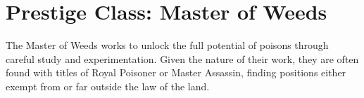 
\usepackage{color} %
\usepackage{fancyhdr} %
\newif\ifdm

\newcommand{\wherein}[1]{\textbf{ \LARGE Wherein} \begin{itemize} #1 \end{itemize}} 
\newcommand{\witem}[1]{\item[$\cdot$] {\em #1} }
\newcommand{\dmonly}[1]{\ifdm { \color{red} #1 } \else { } \fi}
\newcommand{\HS}{H\'arom-s\'al}



\dmonly{ {\LARGE DM COPY} }



\section*{Prestige Class: Master of Weeds}

The Master of Weeds works to unlock the full potential of poisons through careful study and experimentation.
Given the nature of their work, they are often found with titles of Royal Poisoner or Master Assassin, finding positions either exempt from or far outside the law of the land.


